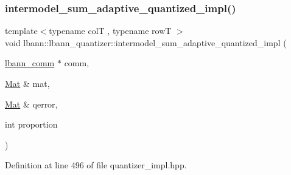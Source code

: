 \subsubsection{\texorpdfstring{intermodel\+\_\+sum\+\_\+adaptive\+\_\+quantized\+\_\+impl()}{intermodel\_sum\_adaptive\_quantized\_impl()}}
{\footnotesize\ttfamily template$<$typename colT , typename rowT $>$ \\
void lbann\+::lbann\+\_\+quantizer\+::intermodel\+\_\+sum\+\_\+adaptive\+\_\+quantized\+\_\+impl (\begin{DoxyParamCaption}\item[{\hyperlink{classlbann_1_1lbann__comm}{lbann\+\_\+comm} $\ast$}]{comm,  }\item[{\hyperlink{base_8hpp_a68f11fdc31b62516cb310831bbe54d73}{Mat} \&}]{mat,  }\item[{\hyperlink{base_8hpp_a68f11fdc31b62516cb310831bbe54d73}{Mat} \&}]{qerror,  }\item[{int}]{proportion }\end{DoxyParamCaption})\hspace{0.3cm}{\ttfamily [private]}}



Definition at line 496 of file quantizer\+\_\+impl.\+hpp.


